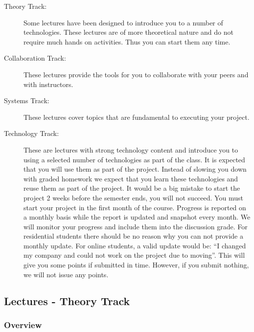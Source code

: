 \begin{description}

\item[Theory Track:]
Some lectures have been designed to introduce you to a number of
technologies. These lectures are of more theoretical nature and do not
require much hands on activities. Thus you can start them any time.

\item[Collaboration Track:]
These lectures provide the tools for you to collaborate with your peers
and with instructors.

\item[Systems Track:]
These lectures cover topics that are fundamental to executing your
project.

\item[Technology Track:]
These are lectures with strong technology content and introduce you to
using a selected number of technologies as part of the class. It is
expected that you will use them as part of the project. Instead of
slowing you down with graded homework we expect that you learn these
technologies and reuse them as part of the project. It would be a big
mistake to start the project 2 weeks before the semester ends, you will
not succeed. You must start your project in the first month of the
course. Progress is reported on a monthly basis while the report is
updated and snapshot every month. We will monitor your progress and
include them into the discussion grade. For residential students there
should be no reason why you can not provide a monthly update. For online
students, a valid update would be: ``I changed my company and could not
work on the project due to moving''. This will give you some points if
submitted in time. However, if you submit nothing, we will not issue any
points.

\end{description}

\subsection{Lectures - Theory Track}\label{lectures---theory-track}


\subsubsection{Overview}


